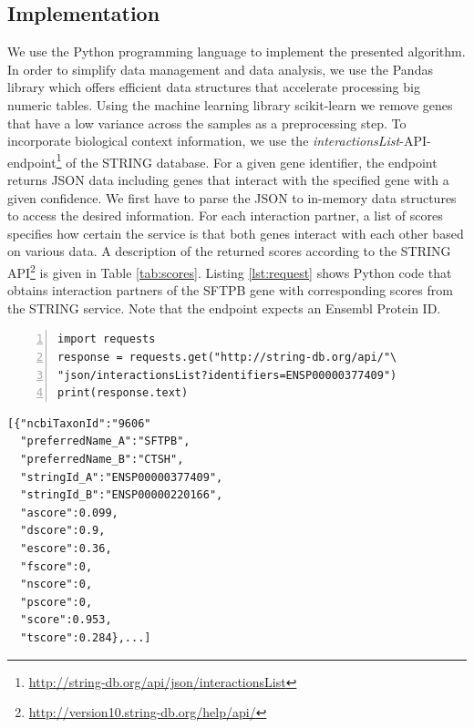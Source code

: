 \documentclass[10pt, conference, compsocconf]{IEEEtran}
\begin{document}
\subsection{Implementation}
\label{subsec:implementation}
We use the Python programming language \citep{Python95} to implement the presented algorithm.
In order to simplify data management and data analysis, we use the Pandas \citep{Pandas11} library which offers efficient data structures that accelerate processing big numeric tables.
Using the machine learning library scikit-learn \citep{scikit-learn} we remove genes that have a low variance across the samples as a preprocessing step.
To incorporate biological context information, we use the \textit{interactionsList}-API-endpoint\footnote{\url{http://string-db.org/api/json/interactionsList}} of the STRING database.
For a given gene identifier, the endpoint returns JSON data including genes that interact with the specified gene with a given confidence.
We first have to parse the JSON to in-memory data structures to access the desired information.
For each interaction partner, a list of scores specifies how certain the service is that both genes interact with each other based on various data.
A description of the returned scores according to the STRING API\footnote{\url{http://version10.string-db.org/help/api/}} is given in Table \ref{tab:scores}.
Listing \ref{lst:request} shows Python code that obtains interaction partners of the SFTPB gene with corresponding scores from the STRING service.
Note that the endpoint expects an Ensembl Protein ID.
\lstset{language=Python}
\lstset{frame=lines}
\lstset{captionpos=b}
\lstset{basicstyle=\footnotesize}
\begin{lstlisting}[numbers=left,stepnumber=1]
import requests
response = requests.get("http://string-db.org/api/"\
"json/interactionsList?identifiers=ENSP00000377409")
print(response.text)
\end{lstlisting}
\lstset{language=Python}
\lstset{frame=lines}
\lstset{captionpos=b}
\lstset{basicstyle=\footnotesize}
\begin{lstlisting}
[{"ncbiTaxonId":"9606"
  "preferredName_A":"SFTPB",
  "preferredName_B":"CTSH",
  "stringId_A":"ENSP00000377409",
  "stringId_B":"ENSP00000220166",
  "ascore":0.099,
  "dscore":0.9,
  "escore":0.36,
  "fscore":0,
  "nscore":0,
  "pscore":0,
  "score":0.953,
  "tscore":0.284},...]
\end{lstlisting}
\end{document}
